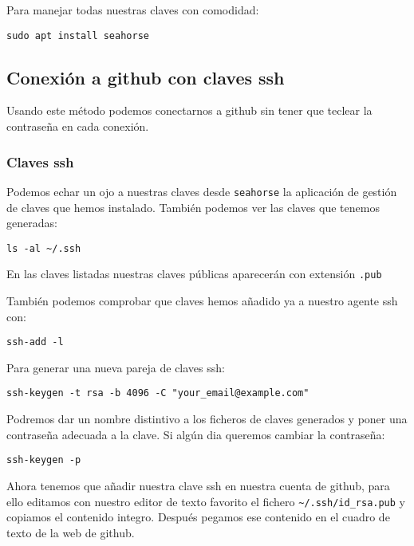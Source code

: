 \documentclass[
  12pt,
  spanish,
]{article}
\begin{document}
Para manejar todas nuestras claves con comodidad:

\texttt{sudo\ apt\ install\ seahorse}

\hypertarget{conexiuxf3n-a-github-con-claves-ssh}{%
\subsection{Conexión a github con claves
ssh}\label{conexiuxf3n-a-github-con-claves-ssh}}

Usando este método podemos conectarnos a github sin tener que teclear la
contraseña en cada conexión.

\hypertarget{claves-ssh}{%
\subsubsection{Claves ssh}\label{claves-ssh}}

Podemos echar un ojo a nuestras claves desde \texttt{seahorse} la
aplicación de gestión de claves que hemos instalado. También podemos ver
las claves que tenemos generadas:

\begin{verbatim}
ls -al ~/.ssh
\end{verbatim}

En las claves listadas nuestras claves públicas aparecerán con extensión
\texttt{.pub}

También podemos comprobar que claves hemos añadido ya a nuestro agente
ssh con:

\begin{verbatim}
ssh-add -l
\end{verbatim}

Para generar una nueva pareja de claves ssh:

\begin{verbatim}
ssh-keygen -t rsa -b 4096 -C "your_email@example.com"
\end{verbatim}

Podremos dar un nombre distintivo a los ficheros de claves generados y
poner una contraseña adecuada a la clave. Si algún dia queremos cambiar
la contraseña:

\begin{verbatim}
ssh-keygen -p
\end{verbatim}

Ahora tenemos que añadir nuestra clave ssh en nuestra cuenta de github,
para ello editamos con nuestro editor de texto favorito el fichero
\texttt{\textasciitilde{}/.ssh/id\_rsa.pub} y copiamos el contenido
integro. Después pegamos ese contenido en el cuadro de texto de la web
de github.
\end{document}
